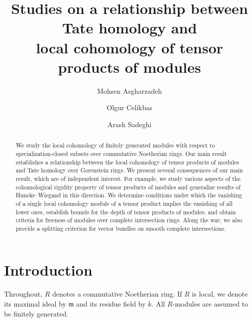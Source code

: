 \documentclass[11pt]{amsart}
\author{Mohsen Asgharzadeh}
\author{Olgur Celikbas}
\author[Arash Sadeghi]{Arash Sadeghi}
\theoremstyle{definition}
\theoremstyle{definition}
\numberwithin{equation}{section}
\newcommand{\fm}{\mathfrak{m}}
\begin{document}
\title[Tate homology and local cohomology of tensor products of modules]{Studies on a relationship between Tate homology and \\local cohomology of tensor products of modules}



\begin{abstract}
We study the local cohomology of finitely generated modules with respect to specialization-closed subsets over commutative Noetherian rings. Our main result establishes a relationship between the local cohomology of tensor products of modules and Tate homology over Gorenstein rings. We present several consequences of our main result, which are of independent interest. For example, we study various aspects of the cohomological rigidity property of tensor products of modules and generalize results of Huneke--Wiegand in this direction. We determine conditions under which the vanishing of a single local cohomology module of a tensor product implies the vanishing of all lower ones, establish bounds for the depth of tensor products of modules, and obtain criteria for freeness of modules over complete intersection rings. Along the way, we also provide a splitting criterion for vector bundles on smooth complete intersections.
\end{abstract}

\maketitle{}

{\renewcommand\thefootnote{}}

\setcounter{tocdepth}{1}
\tableofcontents

\section{Introduction} Throughout, $R$ denotes a commutative Noetherian ring. If $R$ is local, we denote its maximal ideal by $\fm$ and its residue field by $k$. All $R$-modules are assumed to be finitely generated.
\end{document}
